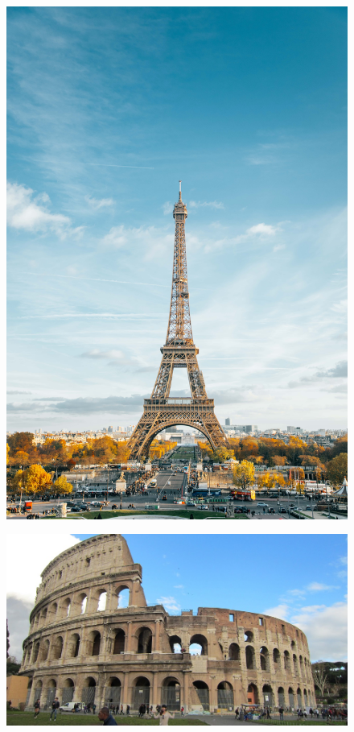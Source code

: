 \begin{figure}[H]
\centering
\begin{minipage}{.3\textwidth}
  \centering
  \includegraphics[width=.7\linewidth]{04.Desarrollo/04.Entrega4/01.Iteracion4_1/00.Figuras/01.eiffel.jpg}
  \label{fig:E4_torreEiffel}
\end{minipage}%
\begin{minipage}{.3\textwidth}
  \centering
  \includegraphics[width=.9\linewidth]{04.Desarrollo/04.Entrega4/01.Iteracion4_1/00.Figuras/02.coliseo.jpg}
  \label{fig:E4_coliseo}
\end{minipage}

\end{figure}
